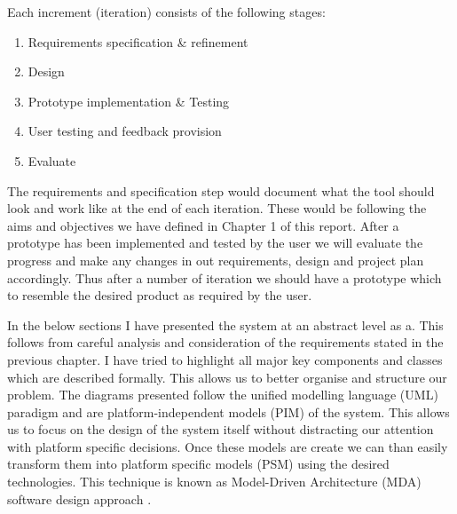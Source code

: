 Each increment (iteration) consists of the following stages:
\begin{enumerate}
	\item Requirements specification \& refinement
	\item Design
	\item Prototype implementation \& Testing
	\item User testing and feedback provision
	\item Evaluate
\end{enumerate}
The requirements and specification step would document what the tool should look and work like at the end of each iteration. These would be following the aims and objectives we have defined in Chapter 1 of this report. After a prototype has been implemented and tested by the user we will evaluate the progress and make any changes in out requirements, design and project plan accordingly. Thus after a number of iteration we should have a prototype which to resemble the desired product as required by the user.

In the below sections I have presented the system at an abstract level as a. This follows from careful analysis and consideration of the requirements stated in the previous chapter. I have tried to highlight all major key components and classes which are described formally. This allows us to better organise and structure our problem. The diagrams presented follow the unified modelling language (UML) paradigm \cite{uml} and are platform-independent models (PIM) of the system. This allows us to focus on the design of the system itself without distracting our attention with platform specific decisions. Once these models are create we can than easily transform them into platform specific models (PSM) using the desired technologies. This technique is known as Model-Driven Architecture (MDA) software design approach \cite{mda}.

